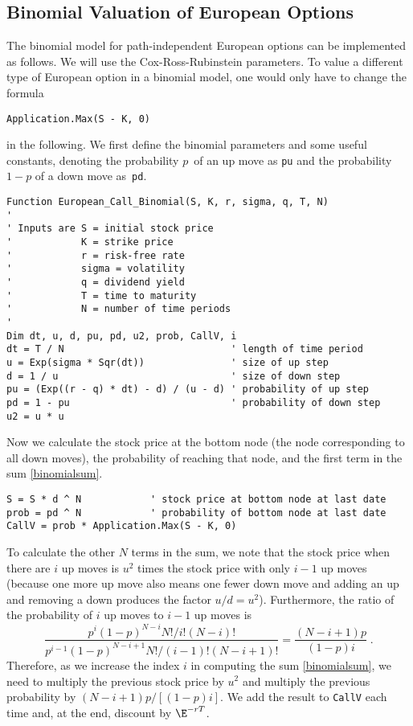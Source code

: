 \subsection*{Binomial Valuation of European Options}

The binomial model for path-independent European options can be implemented as follows.  We will use the Cox-Ross-Rubinstein parameters.  To value a different type of European option in a binomial model, one would only have to change the formula 
\small\begin{center}
\verb!Application.Max(S - K, 0)! 
\end{center}\normalsize
in the following.  We first define the binomial parameters and some useful constants, denoting the probability $p\,$ of an up move as \verb!pu! and the probability $1-p$ of a down move as~\verb!pd!.  

\small\begin{verbatim}
Function European_Call_Binomial(S, K, r, sigma, q, T, N)
'
' Inputs are S = initial stock price
'            K = strike price
'            r = risk-free rate
'            sigma = volatility
'            q = dividend yield
'            T = time to maturity
'            N = number of time periods
'
Dim dt, u, d, pu, pd, u2, prob, CallV, i
dt = T / N                             ' length of time period
u = Exp(sigma * Sqr(dt))               ' size of up step
d = 1 / u                              ' size of down step
pu = (Exp((r - q) * dt) - d) / (u - d) ' probability of up step
pd = 1 - pu                            ' probability of down step
u2 = u * u
\end{verbatim}\normalsize

\noindent Now we calculate the stock price at the bottom node (the node corresponding to all down moves), the probability of reaching that node, and the first term in the sum \eqref{binomialsum}.

\small\begin{verbatim}
S = S * d ^ N            ' stock price at bottom node at last date
prob = pd ^ N            ' probability of bottom node at last date
CallV = prob * Application.Max(S - K, 0)      
\end{verbatim}\normalsize

To calculate the other $N$ terms in the sum, we note that the stock price when there are $i$ up moves is $u^2$ times the stock price with only $i-1$ up moves (because one more up move also means one fewer down move and adding an up and removing a down produces the factor $u/d = u^2$).  Furthermore, the ratio of the probability of $i$ up moves to $i-1$ up moves is
$$\frac{p^i(1-p)^{N-i}N!/i!(N-i)!}{p^{i-1}(1-p)^{N-i+1}N!/(i-1)!(N-i+1)!} = \frac{(N-i+1)p}{(1-p)i}\; .$$
Therefore, as we increase the index $i$ in computing the sum \eqref{binomialsum}, we need to multiply the previous stock price by $u^2$ and multiply the previous probability by $(N-i+1)p/[(1-p)i]$.  We add the result to \verb!CallV! each time and, at the end, discount by $\E^{-rT}$.

